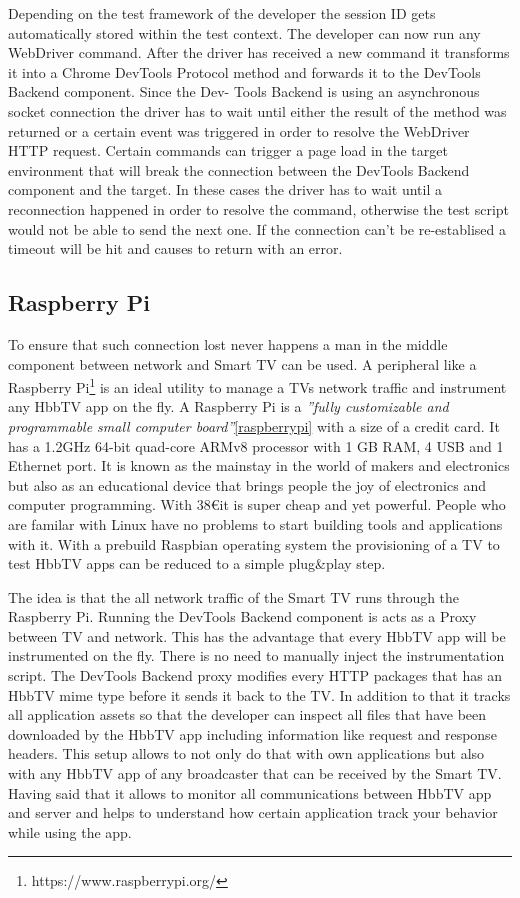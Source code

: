 Depending on the test framework of the developer the session ID gets automatically stored within the
test context. The developer can now run any WebDriver command. After the driver has received a new
command it transforms it into a Chrome DevTools Protocol method and forwards it to the DevTools
Backend component. Since the Dev- Tools Backend is using an asynchronous socket connection the driver
has to wait until either the result of the method was returned or a certain event was triggered in
order to resolve the WebDriver HTTP request. Certain commands can trigger a page load in the target
environment that will break the connection between the DevTools Backend component and the target.
In these cases the driver has to wait until a reconnection happened in order to resolve the command,
otherwise the test script would not be able to send the next one. If the connection can't be
re-establised a timeout will be hit and causes to return with an error.

\subsection{Raspberry Pi\label{sec:pi}}

To ensure that such connection lost never happens a man in the middle component between network and
Smart TV can be used. A peripheral like a Raspberry Pi\footnote{https://www.raspberrypi.org/} is
an ideal utility to manage a TVs network traffic and instrument any HbbTV app on the fly. A
Raspberry Pi is a \textit{''fully customizable and programmable small computer board''}\ref{raspberrypi}
with a size of a credit card. It has a 1.2GHz 64-bit quad-core ARMv8 processor with 1 GB RAM,
4 USB and 1 Ethernet port. It is known as the mainstay in the world of makers and electronics but
also as an educational device that brings people the joy of electronics and computer programming.
With 38\euro it is super cheap and yet powerful. People who are familar with Linux have no problems
to start building tools and applications with it. With a prebuild Raspbian operating system the
provisioning of a TV to test HbbTV apps can be reduced to a simple plug\&play step.

The idea is that the all network traffic of the Smart TV runs through the Raspberry Pi. Running
the DevTools Backend component is acts as a Proxy between TV and network. This has the advantage
that every HbbTV app will be instrumented on the fly. There is no need to manually inject the
instrumentation script. The DevTools Backend proxy modifies every HTTP packages that has an HbbTV
mime type before it sends it back to the TV. In addition to that it tracks all application assets
so that the developer can inspect all files that have been downloaded by the HbbTV app including
information like request and response headers. This setup allows to not only do that with own
applications but also with any HbbTV app of any broadcaster that can be received by the Smart TV.
Having said that it allows to monitor all communications between HbbTV app and server and helps
to understand how certain application track your behavior while using the app.

